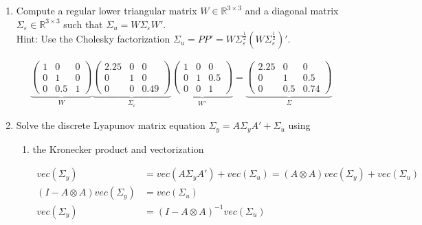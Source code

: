 \documentclass[a4paper]{scrartcl}
\begin{document}
\begin{enumerate}
\begin{solution}
	\end{solution}
	
	\item Compute a regular lower triangular matrix $W \in \mathbb{R}^{3 \times 3}$ and a diagonal matrix $\Sigma_\varepsilon \in \mathbb{R}^{3 \times 3}$ such that $\Sigma_u=W \Sigma_\varepsilon W'$.\\Hint: Use the Cholesky factorization $\Sigma_u = P P' = W \Sigma_\varepsilon^{\frac{1}{2}}(W \Sigma_\varepsilon^{\frac{1}{2}})'$.
	\begin{solution}
		\begin{align*}
		\underbrace{\begin{pmatrix}1&0&0\\0&1&0\\0&0.5&1\end{pmatrix}}_W \underbrace{\begin{pmatrix}2.25&0&0\\0&1&0\\0&0&0.49\end{pmatrix}}_{\Sigma_\varepsilon} \underbrace{\begin{pmatrix}1&0&0\\0&1&0.5\\0&0&1\end{pmatrix}}_{W'} = \underbrace{\begin{pmatrix}2.25&0&0\\0&1&0.5\\0&0.5&0.74\end{pmatrix}}_{\Sigma}
		\end{align*}
	\end{solution}
	
	\item Solve the discrete Lyapunov matrix equation $\Sigma_{y} = A\Sigma_{y}A' + \Sigma_{u}$ using
	\begin{enumerate}
		\item the Kronecker product and vectorization
			\begin{solution}
			\begin{align*}
			vec(\Sigma_y) &= vec(A \Sigma_y A') + vec(\Sigma_u) = (A \otimes A)vec(\Sigma_y) + vec(\Sigma_u)\\
			(I-A\otimes A)vec(\Sigma_y) &= vec(\Sigma_u)\\
			vec(\Sigma_y) &= (I-A\otimes A)^{-1}vec(\Sigma_u)
			\end{align*}
			

\end{solution}
\end{enumerate}
\end{enumerate}
\end{document}
